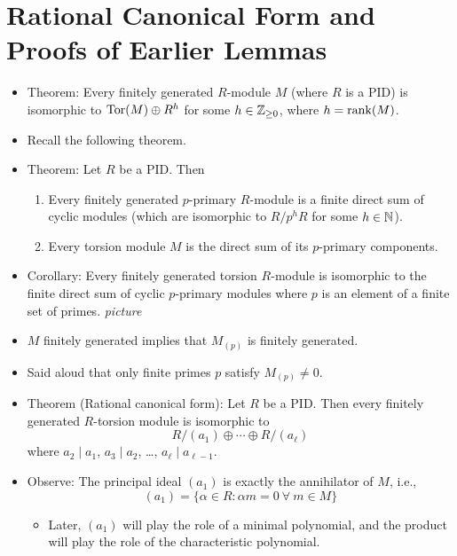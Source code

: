 \documentclass[../notes.tex]{subfiles}
\begin{document}
\section{Rational Canonical Form and Proofs of Earlier Lemmas}
\begin{itemize}
    \item {}Theorem: Every finitely generated $R$-module $M$ (where $R$ is a PID) is isomorphic to $\operatorname{Tor}(M)\oplus R^h$ for some $h\in{\mathbb{Z}_{\geq 0}}$, where $h=\rank(M)$.
    \item Recall the following theorem.
    \item Theorem: Let $R$ be a PID. Then
    \begin{enumerate}[label={(\arabic*)}]
        \item Every finitely generated $p$-primary $R$-module is a finite direct sum of cyclic modules (which are isomorphic to $R/p^hR$ for some $h\in\mathbb{N}$).
        \item Every torsion module $M$ is the direct sum of its $p$-primary components.
    \end{enumerate}
    \item Corollary: Every finitely generated torsion $R$-module is isomorphic to the finite direct sum of cyclic $p$-primary modules where $p$ is an element of a finite set of primes.
    \emph{picture}
    \item $M$ finitely generated implies that $M_{(p)}$ is finitely generated.
    \item Said aloud that only finite primes $p$ satisfy $M_{(p)}\neq 0$.
    \item Theorem (Rational canonical form): Let $R$ be a PID. Then every finitely generated $R$-torsion module is isomorphic to
    \begin{equation*}
        R/(a_1)\oplus\cdots\oplus R/(a_\ell)
    \end{equation*}
    where $a_2\mid a_1$, $a_3\mid a_2$, \dots, $a_\ell\mid a_{\ell-1}$.
    \item Observe: The principal ideal $(a_1)$ is exactly the annihilator of $M$, i.e.,
    \begin{equation*}
        (a_1) = \{\alpha\in R:\alpha m=0\ \forall\ m\in M\}
    \end{equation*}
    \begin{itemize}
        \item Later, $(a_1)$ will play the role of a minimal polynomial, and the product will play the role of the characteristic polynomial.
    \end{itemize}

\end{itemize}
\end{document}
